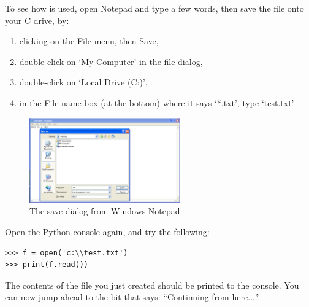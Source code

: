 \begin{WINDOWS}

To see how  is used, open Notepad and type a few words, then save the file onto your C drive, by:

\begin{enumerate}
 \item clicking on the File menu, then Save,
 \item double-click on `My Computer' in the file dialog,
 \item double-click on `Local Drive (C:)',
 \item in the File name box (at the bottom) where it says `*.txt', type `test.txt' 
\end{enumerate}

\begin{figure}
\begin{center}
\includegraphics[width=65mm]{eps/figure17.eps}
\end{center}
\caption{The save dialog from Windows Notepad.}\label{fig17}
\end{figure}

Open the Python console again, and try the following:

\begin{listing}
\begin{verbatim}
>>> f = open('c:\\test.txt')
>>> print(f.read())
\end{verbatim}
\end{listing}

The contents of the file you just created should be printed to the console. You can now jump ahead to the bit that says: ``Continuing from here$\ldots$''.
\end{WINDOWS}

